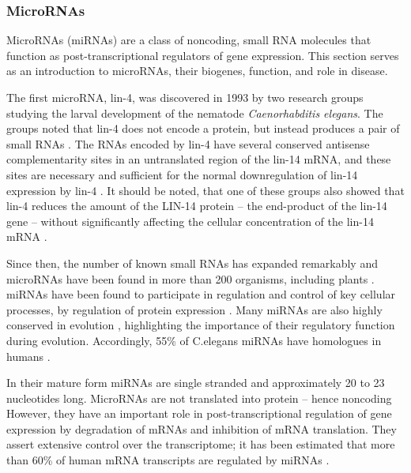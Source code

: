 \subsubsection{MicroRNAs}\label{micrornas}

MicroRNAs (miRNAs) are a class of noncoding, small RNA molecules that function
as post-transcriptional regulators of gene expression. This section serves as
an introduction to microRNAs, their biogenes, function, and role in disease.

The first microRNA, lin-4, was discovered in 1993 by two research groups
studying the larval development of the nematode \emph{Caenorhabditis elegans}.
The groups noted that lin-4 does not encode a protein, but instead produces a
pair of small RNAs \citep{Lee1993,Wightman1993}. The RNAs encoded by lin-4 have several
conserved antisense complementarity sites in an untranslated region of the
lin-14 mRNA, and these sites are necessary and sufficient for the normal
downregulation of lin-14 expression by lin-4 \citep{Lee1993,Wightman1993}. It
should be noted, that one of these groups also showed that lin-4 reduces the
amount of the LIN-14 protein -- the end-product of the lin-14 gene -- without
significantly affecting the cellular concentration of the lin-14 mRNA
\citep{??}. %

Since then, the number of known small RNAs has expanded remarkably and
microRNAs have been found in more than 200 organisms, including plants
\citep{Jones-Rhoades2006,TOINENERILAJEISTA}. miRNAs have been found to
participate in regulation and control of key cellular
processes, by regulation of protein expression \citep{Bushati2007}. Many miRNAs are
also highly conserved in evolution \citep{Bartel2004}, highlighting the
importance of their regulatory function during evolution. Accordingly, 55\% of
C.elegans miRNAs have homologues in humans \cite{Ibanez-Ventoso2008}.

In their mature form miRNAs are single stranded and approximately 20 to 23
nucleotides long. MicroRNAs are not translated into protein -- hence noncoding
However, they have an important role in post-transcriptional regulation of
gene expression by degradation of mRNAs and inhibition of mRNA translation.
They assert extensive control over the transcriptome; it has been estimated
that more than 60\% of human mRNA transcripts are regulated by miRNAs
\citep{CITE}.

